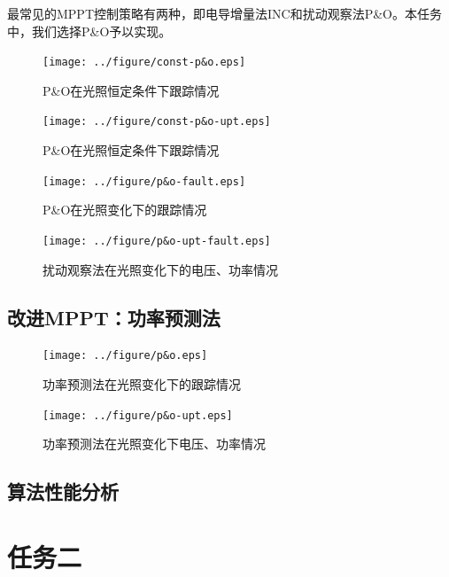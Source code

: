 \documentclass[a4paper,12pt]{article}
\begin{document}
    最常见的MPPT控制策略有两种，即电导增量法INC和扰动观察法P\&O。本任务中，我们选择P\&O予以实现。
    \begin{figure}[htbp]
        \centering
        \texttt{[image: ../figure/const-p\&o.eps]}
        \caption{P\&O在光照恒定条件下跟踪情况}
        \label{fig:const-po}
    \end{figure}
    \begin{figure}[htbp]
        \centering
        \texttt{[image: ../figure/const-p\&o-upt.eps]}
        \caption{P\&O在光照恒定条件下跟踪情况}
        \label{fig:const-po-upt}
    \end{figure}
    \begin{figure}[htbp]
        \centering
        \texttt{[image: ../figure/p\&o-fault.eps]}
        \caption{P\&O在光照变化下的跟踪情况}
        \label{fig:po-fault}
    \end{figure}
    \begin{figure}[htbp]
        \centering
        \texttt{[image: ../figure/p\&o-upt-fault.eps]}
        \caption{扰动观察法在光照变化下的电压、功率情况}
        \label{fig:po-fault-upt}
    \end{figure}
    \subsection{改进MPPT：功率预测法} %
    \label{sub:改进mppt_功率预测法}
    \begin{figure}[htbp]
        \centering
        \texttt{[image: ../figure/p\&o.eps]}
        \caption{功率预测法在光照变化下的跟踪情况}
        \label{fig:po}
    \end{figure}
    \begin{figure}[htbp]
        \centering
        \texttt{[image: ../figure/p\&o-upt.eps]}
        \caption{功率预测法在光照变化下电压、功率情况}
        \label{fig:po-upt}
    \end{figure}
    \subsection{算法性能分析} %
    \label{sub:算法性能分析}
    
    \section{任务二} %
    \label{sec:任务二}
\end{document}
